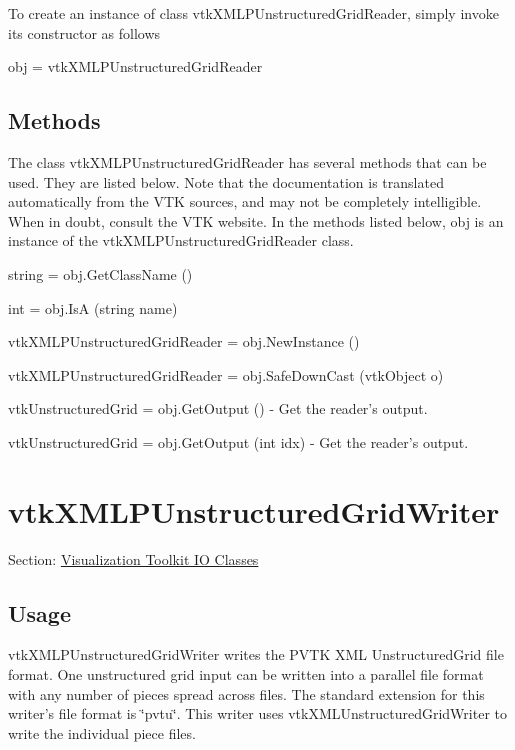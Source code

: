 To create an instance of class vtk\-X\-M\-L\-P\-Unstructured\-Grid\-Reader, simply invoke its constructor as follows \begin{DoxyVerb}  obj = vtkXMLPUnstructuredGridReader
\end{DoxyVerb}
 \hypertarget{vtkwidgets_vtkxyplotwidget_Methods}{}\subsection{Methods}\label{vtkwidgets_vtkxyplotwidget_Methods}
The class vtk\-X\-M\-L\-P\-Unstructured\-Grid\-Reader has several methods that can be used. They are listed below. Note that the documentation is translated automatically from the V\-T\-K sources, and may not be completely intelligible. When in doubt, consult the V\-T\-K website. In the methods listed below, {\ttfamily obj} is an instance of the vtk\-X\-M\-L\-P\-Unstructured\-Grid\-Reader class. 
\begin{DoxyItemize}
\item {\ttfamily string = obj.\-Get\-Class\-Name ()}  
\item {\ttfamily int = obj.\-Is\-A (string name)}  
\item {\ttfamily vtk\-X\-M\-L\-P\-Unstructured\-Grid\-Reader = obj.\-New\-Instance ()}  
\item {\ttfamily vtk\-X\-M\-L\-P\-Unstructured\-Grid\-Reader = obj.\-Safe\-Down\-Cast (vtk\-Object o)}  
\item {\ttfamily vtk\-Unstructured\-Grid = obj.\-Get\-Output ()} -\/ Get the reader's output.  
\item {\ttfamily vtk\-Unstructured\-Grid = obj.\-Get\-Output (int idx)} -\/ Get the reader's output.  
\end{DoxyItemize}\hypertarget{vtkio_vtkxmlpunstructuredgridwriter}{}\section{vtk\-X\-M\-L\-P\-Unstructured\-Grid\-Writer}\label{vtkio_vtkxmlpunstructuredgridwriter}
Section\-: \hyperlink{sec_vtkio}{Visualization Toolkit I\-O Classes} \hypertarget{vtkwidgets_vtkxyplotwidget_Usage}{}\subsection{Usage}\label{vtkwidgets_vtkxyplotwidget_Usage}
vtk\-X\-M\-L\-P\-Unstructured\-Grid\-Writer writes the P\-V\-T\-K X\-M\-L Unstructured\-Grid file format. One unstructured grid input can be written into a parallel file format with any number of pieces spread across files. The standard extension for this writer's file format is \char`\"{}pvtu\char`\"{}. This writer uses vtk\-X\-M\-L\-Unstructured\-Grid\-Writer to write the individual piece files.

